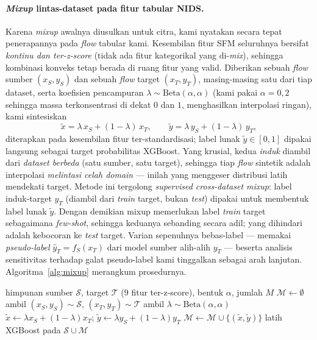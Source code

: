 \documentclass[11pt,a4paper]{article}
\begin{document}
\paragraph{\emph{Mixup} lintas-dataset pada fitur tabular NIDS.} Karena \emph{mixup}
awalnya diusulkan untuk citra, kami nyatakan secara tepat penerapannya pada
\emph{flow} tabular kami. Kesembilan fitur SFM seluruhnya bersifat
\emph{kontinu dan ter-z-score} (tidak ada fitur kategorikal yang di-\emph{mix}),
sehingga kombinasi konveks tetap berada di ruang fitur yang valid. Diberikan
sebuah \emph{flow} sumber $(x_S, y_S)$ dan sebuah \emph{flow} target $(x_T, y_T)$,
masing-masing satu dari tiap dataset, serta koefisien pencampuran
$\lambda \sim \mathrm{Beta}(\alpha,\alpha)$ (kami pakai $\alpha=0{,}2$ sehingga
massa terkonsentrasi di dekat $0$ dan $1$, menghasilkan interpolasi ringan), kami
sintesiskan
\begin{equation}
\tilde{x} = \lambda\, x_S + (1-\lambda)\, x_T,
\qquad
\tilde{y} = \lambda\, y_S + (1-\lambda)\, y_T,
\label{eq:mixup}
\end{equation}
diterapkan pada kesembilan fitur ter-standardisasi; label lunak
$\tilde{y}\in[0,1]$ dipakai langsung sebagai target probabilitas XGBoost. Yang
krusial, kedua \emph{induk} diambil dari \emph{dataset berbeda} (satu sumber, satu
target), sehingga tiap \emph{flow} sintetik adalah interpolasi \emph{melintasi
celah domain} --- inilah yang menggeser distribusi latih mendekati target. Metode ini
tergolong \emph{supervised cross-dataset mixup}: label induk-target $y_T$ (diambil
dari \emph{train} target, bukan \emph{test}) dipakai untuk membentuk label lunak
$\tilde{y}$. Dengan demikian mixup memerlukan label \emph{train} target sebagaimana
\emph{few-shot}, sehingga keduanya sebanding secara adil; yang dihindari adalah
kebocoran ke \emph{test} target. Varian sepenuhnya bebas-label --- memakai
\emph{pseudo-label} $\hat{y}_T = f_S(x_T)$ dari model sumber alih-alih $y_T$ ---
beserta analisis sensitivitas terhadap galat pseudo-label kami tinggalkan sebagai
arah lanjutan. Algoritma~\ref{alg:mixup} merangkum prosedurnya.

\begin{algorithm}[h]
\caption{\emph{Cross-dataset mixup} untuk fitur tabular NIDS}
\label{alg:mixup}
\begin{algorithmic}[1]
\Require himpunan sumber $\mathcal{S}$, target $\mathcal{T}$ (9 fitur ter-z-score),
bentuk $\alpha$, jumlah $M$
\State $\mathcal{M} \gets \emptyset$
  \State ambil $(x_S,y_S)\sim\mathcal{S}$, $(x_T,y_T)\sim\mathcal{T}$
  \State ambil $\lambda \sim \mathrm{Beta}(\alpha,\alpha)$
  \State $\tilde{x} \gets \lambda x_S + (1-\lambda) x_T$;\;
         $\tilde{y} \gets \lambda y_S + (1-\lambda) y_T$
  \State $\mathcal{M} \gets \mathcal{M} \cup \{(\tilde{x},\tilde{y})\}$
\EndFor
\State \Return latih XGBoost pada $\mathcal{S}\cup\mathcal{M}$
\end{algorithmic}
\end{algorithm}
\end{document}
